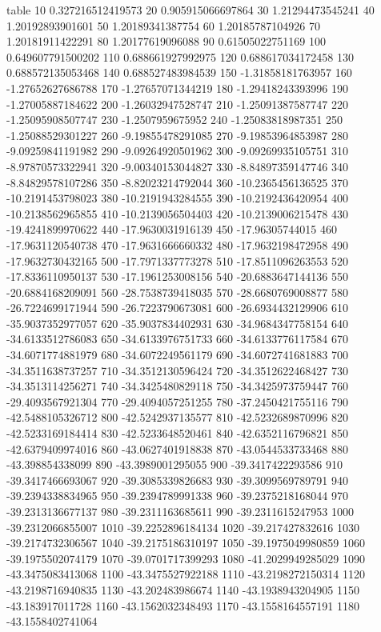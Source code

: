 table {%
10 0.327216512419573
20 0.905915066697864
30 1.21294473545241
40 1.20192893901601
50 1.20189341387754
60 1.20185787104926
70 1.20181911422291
80 1.20177619096088
90 0.61505022751169
100 0.649607791500202
110 0.688661927992975
120 0.688617034172458
130 0.688572135053468
140 0.688527483984539
150 -1.31858181763957
160 -1.27652627686788
170 -1.27657071344219
180 -1.29418243393996
190 -1.27005887184622
200 -1.26032947528747
210 -1.25091387587747
220 -1.25095908507747
230 -1.2507959675952
240 -1.25083818987351
250 -1.25088529301227
260 -9.19855478291085
270 -9.19853964853987
280 -9.09259841191982
290 -9.09264920501962
300 -9.09269935105751
310 -8.97870573322941
320 -9.00340153044827
330 -8.84897359147746
340 -8.84829578107286
350 -8.82023214792044
360 -10.2365456136525
370 -10.2191453798023
380 -10.2191943284555
390 -10.2192436420954
400 -10.2138562965855
410 -10.2139056504403
420 -10.2139006215478
430 -19.4241899970622
440 -17.9630031916139
450 -17.96305744015
460 -17.9631120540738
470 -17.9631666660332
480 -17.9632198472958
490 -17.9632730432165
500 -17.7971337773278
510 -17.8511096263553
520 -17.8336110950137
530 -17.1961253008156
540 -20.6883647144136
550 -20.6884168209091
560 -28.7538739418035
570 -28.6680769008877
580 -26.7224699171944
590 -26.7223790673081
600 -26.6934432129906
610 -35.9037352977057
620 -35.9037834402931
630 -34.9684347758154
640 -34.6133512786083
650 -34.6133976751733
660 -34.6133776117584
670 -34.6071774881979
680 -34.6072249561179
690 -34.6072741681883
700 -34.3511638737257
710 -34.3512130596424
720 -34.3512622468427
730 -34.3513114256271
740 -34.3425480829118
750 -34.3425973759447
760 -29.4093567921304
770 -29.4094057251255
780 -37.2450421755116
790 -42.5488105326712
800 -42.5242937135577
810 -42.5232689870996
820 -42.5233169184414
830 -42.5233648520461
840 -42.6352116796821
850 -42.6379409974016
860 -43.0627401918838
870 -43.0544533733468
880 -43.398854338099
890 -43.3989001295055
900 -39.3417422293586
910 -39.3417466693067
920 -39.3085339826683
930 -39.3099569789791
940 -39.2394338834965
950 -39.2394789991338
960 -39.2375218168044
970 -39.2313136677137
980 -39.2311163685611
990 -39.2311615247953
1000 -39.2312066855007
1010 -39.2252896184134
1020 -39.217427832616
1030 -39.2174732306567
1040 -39.2175186310197
1050 -39.1975049980859
1060 -39.1975502074179
1070 -39.0701717399293
1080 -41.2029949285029
1090 -43.3475083413068
1100 -43.3475527922188
1110 -43.2198272150314
1120 -43.2198716940835
1130 -43.202483986674
1140 -43.1938943204905
1150 -43.183917011728
1160 -43.1562032348493
1170 -43.1558164557191
1180 -43.1558402741064
}
